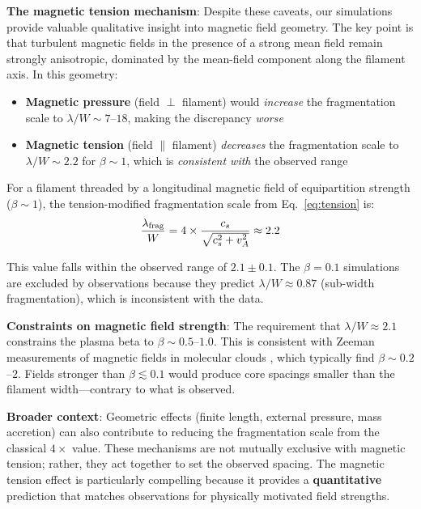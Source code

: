\documentclass[11pt,a4paper]{article}
\begin{document}
\textbf{The magnetic tension mechanism}: Despite these caveats, our simulations provide valuable qualitative insight into magnetic field geometry. The key point is that turbulent magnetic fields in the presence of a strong mean field remain strongly anisotropic, dominated by the mean-field component along the filament axis. In this geometry:
\begin{itemize}
    \item \textbf{Magnetic pressure} (field $\perp$ filament) would \textit{increase} the fragmentation scale to $\lambda/W \sim 7$--$18$, making the discrepancy \textit{worse}
    \item \textbf{Magnetic tension} (field $\parallel$ filament) \textit{decreases} the fragmentation scale to $\lambda/W \sim 2.2$ for $\beta \sim 1$, which is \textit{consistent with} the observed range
\end{itemize}

For a filament threaded by a longitudinal magnetic field of equipartition strength ($\beta \sim 1$), the tension-modified fragmentation scale from Eq.~\ref{eq:tension} is:
\begin{equation}
\frac{\lambda_{\rm frag}}{W} = 4 \times \frac{c_s}{\sqrt{c_s^2 + v_A^2}} \approx 2.2
\label{eq:tension2}
\end{equation}

This value falls within the observed range of $2.1 \pm 0.1$. The $\beta = 0.1$ simulations are excluded by observations because they predict $\lambda/W \approx 0.87$ (sub-width fragmentation), which is inconsistent with the data.

\textbf{Constraints on magnetic field strength}: The requirement that $\lambda/W \approx 2.1$ constrains the plasma beta to $\beta \sim 0.5$--$1.0$. This is consistent with Zeeman measurements of magnetic fields in molecular clouds \citep{Crutcher2012}, which typically find $\beta \sim 0.2$--$2$. Fields stronger than $\beta \lesssim 0.1$ would produce core spacings smaller than the filament width—contrary to what is observed.

\textbf{Broader context}: Geometric effects (finite length, external pressure, mass accretion) can also contribute to reducing the fragmentation scale from the classical $4\times$ value. These mechanisms are not mutually exclusive with magnetic tension; rather, they act together to set the observed spacing. The magnetic tension effect is particularly compelling because it provides a \textbf{quantitative} prediction that matches observations for physically motivated field strengths.
\end{document}
